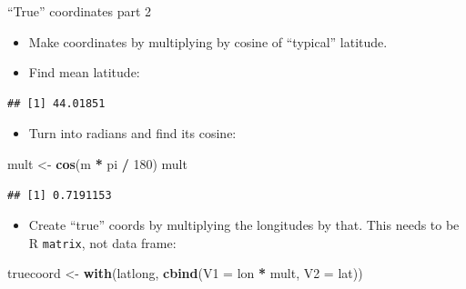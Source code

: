 \documentclass[ignorenonframetext,]{beamer}
\newenvironment{Shaded}{\begin{snugshade}}{\end{snugshade}}
\newcommand{\DataTypeTok}[1]{\textcolor[rgb]{0.13,0.29,0.53}{#1}}
\newcommand{\DecValTok}[1]{\textcolor[rgb]{0.00,0.00,0.81}{#1}}
\newcommand{\KeywordTok}[1]{\textcolor[rgb]{0.13,0.29,0.53}{\textbf{#1}}}
\newcommand{\NormalTok}[1]{#1}
\newcommand{\OperatorTok}[1]{\textcolor[rgb]{0.81,0.36,0.00}{\textbf{#1}}}
\newcommand{\StringTok}[1]{\textcolor[rgb]{0.31,0.60,0.02}{#1}}
\providecommand{\tightlist}{%
  \setlength{\itemsep}{0pt}\setlength{\parskip}{0pt}}
\begin{document}
\begin{frame}[fragile]{``True'' coordinates part 2}
\protect\hypertarget{true-coordinates-part-2}{}

\begin{itemize}
\item
  Make coordinates by multiplying by cosine of ``typical'' latitude.
\item
  Find mean latitude:
\end{itemize}

\begin{Shaded}
\end{Shaded}

\begin{verbatim}
## [1] 44.01851
\end{verbatim}

\begin{itemize}
\tightlist
\item
  Turn into radians and find its cosine:
\end{itemize}

\begin{Shaded}
\begin{Highlighting}[]
\NormalTok{mult <-}\StringTok{ }\KeywordTok{cos}\NormalTok{(m }\OperatorTok{*}\StringTok{ }\NormalTok{pi }\OperatorTok{/}\StringTok{ }\DecValTok{180}\NormalTok{)}
\NormalTok{mult}
\end{Highlighting}
\end{Shaded}

\begin{verbatim}
## [1] 0.7191153
\end{verbatim}

\begin{itemize}
\tightlist
\item
  Create ``true'' coords by multiplying the longitudes by that. This
  needs to be R \texttt{matrix}, not data frame:
\end{itemize}

\begin{Shaded}
\begin{Highlighting}[]
\NormalTok{truecoord <-}\StringTok{ }\KeywordTok{with}\NormalTok{(latlong, }\KeywordTok{cbind}\NormalTok{(}\DataTypeTok{V1 =}\NormalTok{ lon }\OperatorTok{*}\StringTok{ }\NormalTok{mult, }\DataTypeTok{V2 =}\NormalTok{ lat))}
\end{Highlighting}
\end{Shaded}

\end{frame}
\end{document}
